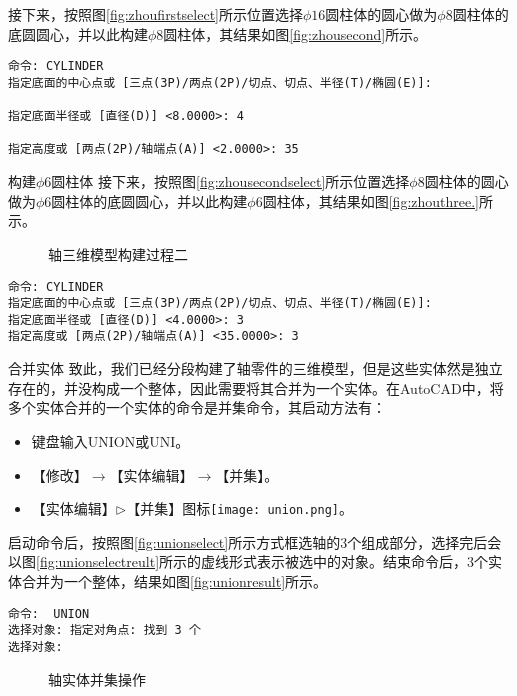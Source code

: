 \begin{procedure}
接下来，按照图\ref{fig:zhoufirstselect}所示位置选择$\phi 16$圆柱体的圆心做为$\phi 8$圆柱体的底圆圆心，并以此构建$\phi 8$圆柱体，其结果如图\ref{fig:zhousecond}所示。

\begin{lstlisting}
命令: CYLINDER
指定底面的中心点或 [三点(3P)/两点(2P)/切点、切点、半径(T)/椭圆(E)]:

指定底面半径或 [直径(D)] <8.0000>: 4

指定高度或 [两点(2P)/轴端点(A)] <2.0000>: 35
\end{lstlisting}
\item 构建$\phi 6$圆柱体
接下来，按照图\ref{fig:zhousecondselect}所示位置选择$\phi 8$圆柱体的圆心做为$\phi 6$圆柱体的底圆圆心，并以此构建$\phi 6$圆柱体，其结果如图\ref{fig:zhouthree.}所示。

\begin{figure}[htbp]
\centering
{}\hspace{30pt}
\caption{轴三维模型构建过程二}
\end{figure}

\begin{lstlisting}
命令: CYLINDER
指定底面的中心点或 [三点(3P)/两点(2P)/切点、切点、半径(T)/椭圆(E)]:
指定底面半径或 [直径(D)] <4.0000>: 3
指定高度或 [两点(2P)/轴端点(A)] <35.0000>: 3
\end{lstlisting}
\item 合并实体
致此，我们已经分段构建了轴零件的三维模型，但是这些实体然是独立存在的，并没构成一个整体，因此需要将其合并为一个实体。在AutoCAD中，将多个实体合并的一个实体的命令是并集命令，其启动方法有：
\begin{itemize}
\item 键盘输入UNION或UNI。
\item 【修改】$\rightarrow$【实体编辑】$\rightarrow$【并集】。
\item 【实体编辑】$\triangleright$【并集】图标\texttt{[image: union.png]}。
\end{itemize}
启动命令后，按照图\ref{fig:unionselect}所示方式框选轴的3个组成部分，选择完后会以图\ref{fig:unionselectreult}所示的虚线形式表示被选中的对象。结束命令后，3个实体合并为一个整体，结果如图\ref{fig:unionresult}所示。
\begin{lstlisting}
命令:  UNION
选择对象: 指定对角点: 找到 3 个
选择对象:
\end{lstlisting}
\begin{figure}[htbp]
\centering
{}\hspace{20pt}
\hspace{20pt}
\caption{轴实体并集操作}
\end{figure}


\end{procedure}

